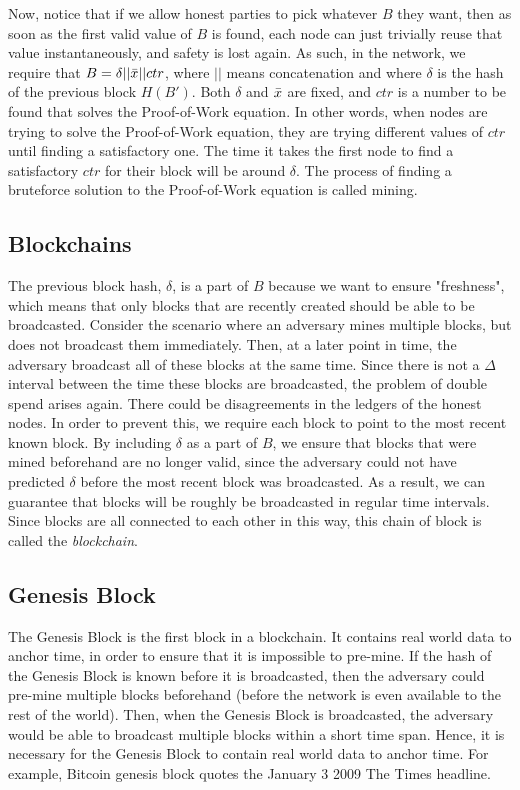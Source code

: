 Now, notice that if we allow honest parties to pick whatever $B$ they want, then as soon as the first valid value of $B$ is found, each node can just trivially reuse that value instantaneously, and safety is lost again. As such, in the network, we require that $B = \delta||\Bar{x}||ctr$, where $||$ means concatenation and where $\delta$ is the hash of the previous block $H(B')$. Both $\delta$ and $\Bar{x}$ are fixed, and $ctr$ is a number to be found that solves the Proof-of-Work equation. In other words, when nodes are trying to solve the Proof-of-Work equation, they are trying different values of $ctr$ until finding a satisfactory one. The time it takes the first node to find a satisfactory $ctr$ for their block will be around $\delta$. The process of finding a bruteforce solution to the Proof-of-Work equation is called mining.

\subsection{Blockchains}

The previous block hash, $\delta$, is a part of $B$ because we want to ensure "freshness", which means that only blocks that are recently created should be able to be broadcasted. Consider the scenario where an adversary mines multiple blocks, but does not broadcast them immediately. Then, at a later point in time, the adversary broadcast all of these blocks at the same time. Since there is not a $\Delta$ interval between the time these blocks are broadcasted, the problem of double spend arises again. There could be disagreements in the ledgers of the honest nodes. In order to prevent this, we require each block to point to the most recent known block. By including $\delta$ as a part of $B$, we ensure that blocks that were mined beforehand are no longer valid, since the adversary could not have predicted $\delta$ before the most recent block was broadcasted. As a result, we can guarantee that blocks will be roughly be broadcasted in regular time intervals. Since blocks are all connected to each other in this way, this chain of block is called the \emph{blockchain}.


\subsection{Genesis Block}

The Genesis Block is the first block in a blockchain. It contains real world data to anchor time, in order to ensure that it is impossible to pre-mine. If the hash of the Genesis Block is known before it is broadcasted, then the adversary could pre-mine multiple blocks beforehand (before the network is even available to the rest of the world). Then, when the Genesis Block is broadcasted, the adversary would be able to broadcast multiple blocks within a short time span. Hence, it is necessary for the Genesis Block to contain real world data to anchor time. For example, Bitcoin genesis block quotes the January 3  2009 The Times headline.

